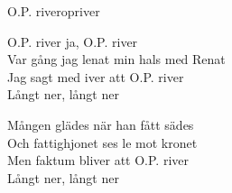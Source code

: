 \begin{song}{O.P. river}{opriver}
\begin{vers}
O.P. river ja, O.P. river\\
Var gång jag lenat min hals med Renat\\
Jag sagt med iver att O.P. river\\
Långt ner, långt ner\\
\end{vers}
\begin{vers}
Mången glädes när han fått sädes\\
Och fattighjonet ses le mot kronet\\
Men faktum bliver att O.P. river\\
Långt ner, långt ner\\
\end{vers}
\end{song}
